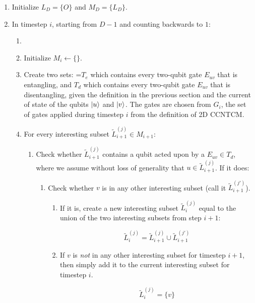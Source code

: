 \begin{enumerate}
\item
Initialize $L_D = \{ O \}$ and $M_D = \{ L_D \}$.
\item
In timestep $i$, starting from $D-1$ and counting backwards to $1$:
\begin{enumerate}
\item
\item
Initialize $M_i \leftarrow \{\}$.
\item
Create two sets: =$T_e$ which contains every two-qubit
gate $E_{uv}$ that is entangling, and $T_d$ which contains every two-qubit
gate $E_{uv}$ that is disentangling, given the definition
in the previous section and the current of state of the qubits $\left\vert{u}\right\rangle$
and $\left\vert{v}\right\rangle$. The gates are
chosen
from $G_i$, the set of gates applied during timestep $i$
from the definition of \textsf{2D CCNTCM}.

\item
For every interesting subset $\tilde{L}^{(j)}_{i+1} \in M_{i+1}$:

\begin{enumerate}
\item Check whether $\tilde{L}^{(j)}_{i+1}$ contains a qubit acted upon by a
$E_{uv} \in T_d$, where we assume without loss of generality that
$u \in \tilde{L}^{(j)}_{i+1}$. If it does:

\begin{enumerate}
\item Check whether $v$ is in any other interesting subset
(call it $\tilde{L}^{(j')}_{i+1}$).

\begin{enumerate}
\item
If it is, create a new interesting subset
$\tilde{L}^{(j)}_{i}$ equal to the union of the two interesting subsets from
step $i+1$:

\begin{equation}
\tilde{L}^{(j)}_{i} = \tilde{L}^{(j)}_{i+1} \cup \tilde{L}^{(j')}_{i+1}
\end{equation}

\item
If $v$ is \emph{not} in any other interesting subset for timestep $i+1$,
then simply add it to the current interesting subset for timestep $i$.

\begin{equation}
\tilde{L}^{(j)}_{i} = \{v\}
\end{equation}


\end{enumerate}
\end{enumerate}
\end{enumerate}
\end{enumerate}
\end{enumerate}
